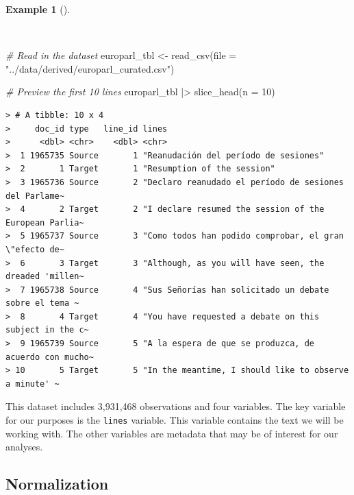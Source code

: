 \documentclass[
  letterpaper,
  DIV=11,
  numbers=noendperiod]{scrreprt}
\newenvironment{Shaded}{\begin{snugshade}}{\end{snugshade}}
\newcommand{\AttributeTok}[1]{\textcolor[rgb]{0.00,0.00,0.00}{#1}}
\newcommand{\CommentTok}[1]{\textcolor[rgb]{0.00,0.00,0.00}{\textit{#1}}}
\newcommand{\DecValTok}[1]{\textcolor[rgb]{0.00,0.00,0.00}{#1}}
\newcommand{\FunctionTok}[1]{\textcolor[rgb]{0.00,0.00,0.00}{#1}}
\newcommand{\NormalTok}[1]{\textcolor[rgb]{0.00,0.00,0.00}{#1}}
\newcommand{\OtherTok}[1]{\textcolor[rgb]{0.00,0.00,0.00}{#1}}
\newcommand{\SpecialCharTok}[1]{\textcolor[rgb]{0.00,0.00,0.00}{#1}}
\newcommand{\StringTok}[1]{\textcolor[rgb]{0.00,0.00,0.00}{#1}}
\theoremstyle{definition}
\newtheorem{example}{Example}[chapter]
\theoremstyle{remark}
\begin{document}
\begin{example}[]\protect\hypertarget{exm-tb-europarl-preview}{}\label{exm-tb-europarl-preview}

~

\begin{Shaded}
\begin{Highlighting}[]
\CommentTok{\# Read in the dataset}
\NormalTok{europarl\_tbl }\OtherTok{\textless{}{-}}
  \FunctionTok{read\_csv}\NormalTok{(}\AttributeTok{file =} \StringTok{"../data/derived/europarl\_curated.csv"}\NormalTok{)}

\CommentTok{\# Preview the first 10 lines}
\NormalTok{europarl\_tbl }\SpecialCharTok{|\textgreater{}}
  \FunctionTok{slice\_head}\NormalTok{(}\AttributeTok{n =} \DecValTok{10}\NormalTok{)}
\end{Highlighting}
\end{Shaded}

\begin{verbatim}
> # A tibble: 10 x 4
>     doc_id type   line_id lines                                                 
>      <dbl> <chr>    <dbl> <chr>                                                 
>  1 1965735 Source       1 "Reanudación del período de sesiones"                 
>  2       1 Target       1 "Resumption of the session"                           
>  3 1965736 Source       2 "Declaro reanudado el período de sesiones del Parlame~
>  4       2 Target       2 "I declare resumed the session of the European Parlia~
>  5 1965737 Source       3 "Como todos han podido comprobar, el gran \"efecto de~
>  6       3 Target       3 "Although, as you will have seen, the dreaded 'millen~
>  7 1965738 Source       4 "Sus Señorías han solicitado un debate sobre el tema ~
>  8       4 Target       4 "You have requested a debate on this subject in the c~
>  9 1965739 Source       5 "A la espera de que se produzca, de acuerdo con mucho~
> 10       5 Target       5 "In the meantime, I should like to observe a minute' ~
\end{verbatim}

\end{example}

This dataset includes 3,931,468 observations and four variables. The key
variable for our purposes is the \texttt{lines} variable. This variable
contains the text we will be working with. The other variables are
metadata that may be of interest for our analyses.

\subsection{Normalization}\label{sec-td-normalization}
\end{document}
